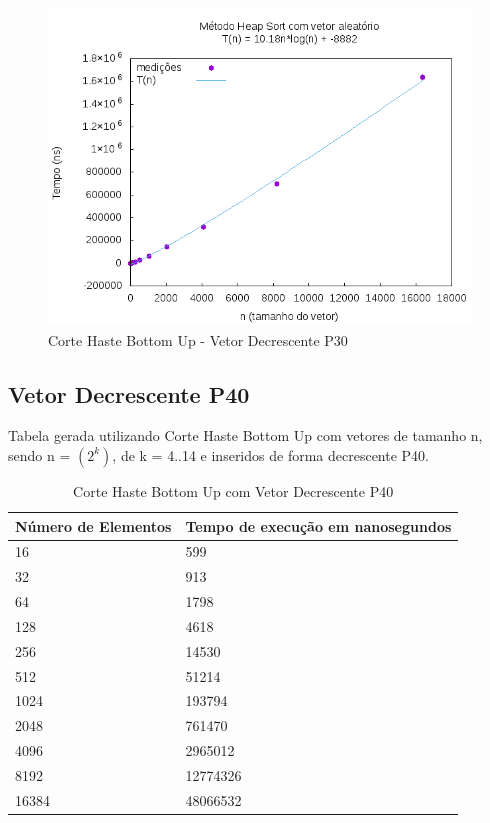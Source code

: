 \documentclass[12pt,a4paper,twoside]{report}
\begin{document}
\begin{figure}[H]
    \centering
    \includegraphics[width=0.7\linewidth]{graficos/HeapSort/vIntAleatorio/vIntAleatorio.png}
  \caption{Corte Haste Bottom Up - Vetor Decrescente P30}
\end{figure}





\subsection{Vetor Decrescente P40}
Tabela gerada utilizando Corte Haste Bottom Up com vetores de tamanho n, sendo n = $(2^k)$, de k = 4..14 e inseridos de forma decrescente P40.
\begin{table}[H]
\centering
\caption{Corte Haste Bottom Up com Vetor Decrescente P40}
\label{my-label}
\begin{tabular}{|l|l|}
\hline
\multicolumn{1}{|c|}{\textbf{Número de Elementos}} & \multicolumn{1}{c|}{\textbf{Tempo de execução em nanosegundos}} \\ \hline
16 & 599 \\ \hline
32 & 913 \\ \hline
64 & 1798 \\ \hline
128 & 4618 \\ \hline
256 & 14530 \\ \hline
512 & 51214 \\ \hline
1024 & 193794 \\ \hline
2048 & 761470 \\ \hline
4096 & 2965012 \\ \hline
8192 & 12774326 \\ \hline
16384 & 48066532 \\ \hline
\end{tabular}
\end{table}
\end{document}
